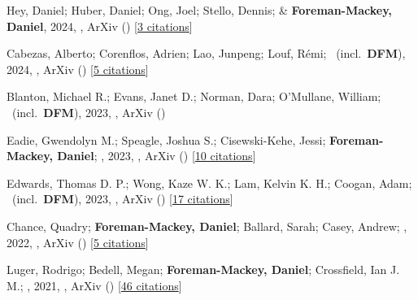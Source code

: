 \item[{\color{numcolor}\scriptsize11}] Hey, Daniel; Huber, Daniel; Ong, Joel; Stello, Dennis; \& \textbf{Foreman-Mackey, Daniel}, 2024, , ArXiv () [\href{https://ui.adsabs.harvard.edu/abs/2024arXiv240302489H}{3 citations}]

\item[{\color{numcolor}\scriptsize10}] Cabezas, Alberto; Corenflos, Adrien; Lao, Junpeng; Louf, R{\'e}mi; \etal\ (incl.\ \textbf{DFM}), 2024, , ArXiv () [\href{https://ui.adsabs.harvard.edu/abs/2024arXiv240210797C}{5 citations}]

\item[{\color{numcolor}\scriptsize9}] Blanton, Michael R.; Evans, Janet D.; Norman, Dara; O'Mullane, William; \etal\ (incl.\ \textbf{DFM}), 2023, , ArXiv ()

\item[{\color{numcolor}\scriptsize8}] Eadie, Gwendolyn M.; Speagle, Joshua S.; Cisewski-Kehe, Jessi; \textbf{Foreman-Mackey, Daniel}; \etal, 2023, , ArXiv () [\href{https://ui.adsabs.harvard.edu/abs/2023arXiv230204703E}{10 citations}]

\item[{\color{numcolor}\scriptsize7}] Edwards, Thomas D. P.; Wong, Kaze W. K.; Lam, Kelvin K. H.; Coogan, Adam; \etal\ (incl.\ \textbf{DFM}), 2023, , ArXiv () [\href{https://ui.adsabs.harvard.edu/abs/2023arXiv230205329E}{17 citations}]

\item[{\color{numcolor}\scriptsize6}] Chance, Quadry; \textbf{Foreman-Mackey, Daniel}; Ballard, Sarah; Casey, Andrew; \etal, 2022, , ArXiv () [\href{https://ui.adsabs.harvard.edu/abs/2022arXiv220611275C}{5 citations}]

\item[{\color{numcolor}\scriptsize5}] Luger, Rodrigo; Bedell, Megan; \textbf{Foreman-Mackey, Daniel}; Crossfield, Ian J. M.; \etal, 2021, , ArXiv () [\href{https://ui.adsabs.harvard.edu/abs/2021arXiv211006271L}{46 citations}]

